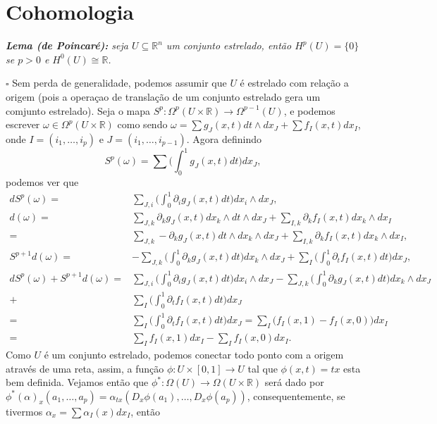 \documentclass{article}
\begin{document}
	\section{Cohomologia}
	
	\textit{\textbf{Lema (de Poincaré):} seja $U \subseteq \mathbb{R}^{n}$ um conjunto estrelado, então $H^{p}(U) = \{0\}$ se $p>0$ e $H^{0}(U) \cong \mathbb{R}$.}
	
	$\square$ Sem perda de generalidade, podemos assumir que $U$ é estrelado com relação a origem (pois a operaçao de translação de um conjunto estrelado gera um comjunto estrelado). Seja o mapa $S^{p}: \Omega^{p}(U \times \mathbb{R}) \to \Omega^{p-1}(U)$, e podemos escrever $\omega \in \Omega^{p}(U \times \mathbb{R}) $ como sendo $\omega = \sum g_{J}(x,t)dt \wedge dx_{J} + \sum f_{I}(x,t)dx_{I}$, onde $I=(i_{1}, \dots ,i_{p})$ e $J=(i_{1}, \dots ,i_{p-1})$. Agora definindo
	$$
	S^{p}(\omega) = \sum \Big( \int_{0}^{1} g_{J}(x,t)dt \Big) dx_{J},
	$$
	podemos ver que
	$$
	\begin{aligned}
	dS^{p}(\omega) =& \sum_{J,i} \Big( \int_{0}^{1} \partial_{i} g_{J}(x,t)dt \Big) dx_{i} \wedge dx_{J},
	\\
	d(\omega) =& \sum_{J,k} \partial_{k} g_{J}(x,t) dx_{k} \wedge dt \wedge dx_{J} + \sum_{I,k} \partial_{k} f_{I}(x,t) dx_{k} \wedge dx_{I}
	\\
	=& \sum_{J,k} -\partial_{k} g_{J}(x,t) dt \wedge dx_{k} \wedge dx_{J} + \sum_{I,k} \partial_{k} f_{I}(x,t) dx_{k} \wedge dx_{I},
	\\
	S^{p+1}d(\omega) =&  -\sum_{J,k} \Big( \int_{0}^{1}  \partial_{k} g_{J}(x,t)dt \Big) dx_{k} \wedge dx_{J} + \sum_{I} \Big( \int_{0}^{1}  \partial_{t} f_{I}(x,t)dt \Big) dx_{J},
	\\
	d S^{p}(\omega) + S^{p+1}d(\omega) =& \sum_{J,i} \Big( \int_{0}^{1} \partial_{i} g_{J}(x,t)dt \Big) dx_{i} \wedge dx_{J} -\sum_{J,k} \Big( \int_{0}^{1}  \partial_{k} g_{J}(x,t)dt \Big) dx_{k} \wedge dx_{J} 
	\\
	+& \sum_{I} \Big( \int_{0}^{1}  \partial_{t} f_{I}(x,t)dt \Big) dx_{J}
	\\
	=& \sum_{I} \Big( \int_{0}^{1}  \partial_{t} f_{I}(x,t)dt \Big) dx_{J} = \sum_{I} \Big( f_{I}(x,1)  - f_{I}(x,0)\Big) dx_{I}
	\\
	=& \sum_{I} f_{I}(x,1) dx_{I} - \sum_{I} f_{I}(x,0) dx_{I}.
	\end{aligned}
	$$
	Como $U$ é um conjunto estrelado, podemos conectar todo ponto com a origem através de uma reta, assim, a função $\phi: U \times [0,1] \to U$ tal que $\phi(x,t) = tx$ esta bem definida. Vejamos então que $\phi^{*} : \Omega(U) \to \Omega(U \times \mathbb{R})$ será dado por $\phi^{*}(\alpha)_{x}(a_{1},\dots,a_{p}) = \alpha_{tx}(D_{x}\phi(a_{1}),\dots, D_{x}\phi(a_{p}))$, consequentemente, se tivermos $\alpha_{x} = \sum \alpha_{I}(x)dx_{I}$, então 
\end{document}
